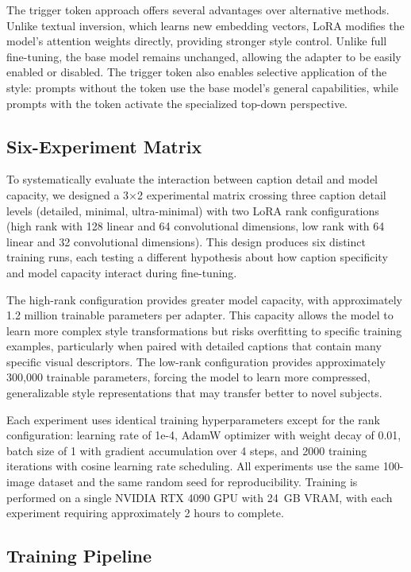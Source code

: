 \documentclass[conference]{IEEEtran}
\begin{document}
The trigger token approach offers several advantages over alternative methods. Unlike textual inversion, which learns new embedding vectors, LoRA modifies the model's attention weights directly, providing stronger style control. Unlike full fine-tuning, the base model remains unchanged, allowing the adapter to be easily enabled or disabled. The trigger token also enables selective application of the style: prompts without the token use the base model's general capabilities, while prompts with the token activate the specialized top-down perspective.

\subsection{Six-Experiment Matrix}

To systematically evaluate the interaction between caption detail and model capacity, we designed a 3$\times$2 experimental matrix crossing three caption detail levels (detailed, minimal, ultra-minimal) with two LoRA rank configurations (high rank with 128 linear and 64 convolutional dimensions, low rank with 64 linear and 32 convolutional dimensions). This design produces six distinct training runs, each testing a different hypothesis about how caption specificity and model capacity interact during fine-tuning.

The high-rank configuration provides greater model capacity, with approximately 1.2 million trainable parameters per adapter. This capacity allows the model to learn more complex style transformations but risks overfitting to specific training examples, particularly when paired with detailed captions that contain many specific visual descriptors. The low-rank configuration provides approximately 300,000 trainable parameters, forcing the model to learn more compressed, generalizable style representations that may transfer better to novel subjects.

Each experiment uses identical training hyperparameters except for the rank configuration: learning rate of 1e-4, AdamW optimizer with weight decay of 0.01, batch size of 1 with gradient accumulation over 4 steps, and 2000 training iterations with cosine learning rate scheduling. All experiments use the same 100-image dataset and the same random seed for reproducibility. Training is performed on a single NVIDIA RTX 4090 GPU with 24~GB VRAM, with each experiment requiring approximately 2 hours to complete.

\subsection{Training Pipeline}
\end{document}

